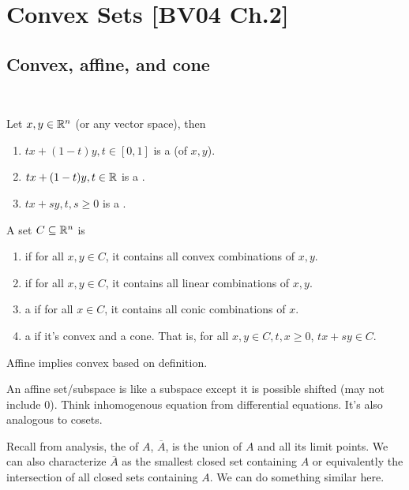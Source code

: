 \documentclass[class=article,crop=false]{standalone}
\begin{document}
\section{Convex Sets [BV04 Ch.2] }
\subsection{Convex, affine, and cone}
~\begin{defn}
	Let $ x,y \in \mathbb{R}^{n}$ (or any vector space), then
	\begin{enumerate}[label=\arabic*)]
		\item $ tx + (1-t)y, t \in [0,1]$ is a  (of $ x,y$).
		\item $ t x+(1-t)y, t \in \mathbb{R}$ is a .
		\item $ t x + sy, t,s \geq 0$ is a  . 
	\end{enumerate}
\end{defn}

\begin{defn}
A set $ C \subseteq \mathbb{R}^{n}$ is
\begin{enumerate}[label=\arabic*)]
	\item {} if for all $ x,y \in C$, it contains all convex combinations of $ x,y$.
	\item  {} if for all $ x,y \in C$, it contains all linear combinations of $ x,y$.
	\item a   if for all $ x \in C$, it contains all conic combinations of $ x$.
	\item a   if it's convex and a cone. That is, for all $ x,y \in C, t,x\geq 0$, $ tx + sy \in C$. 
\end{enumerate}
\end{defn}
\begin{note}
Affine implies convex based on definition.
\end{note}

\begin{remark}
	An affine set/subspace is like a subspace except it is possible shifted (may not include 0). Think inhomogenous equation from differential equations. It's also analogous to cosets.
\end{remark}

Recall from analysis, the  of $ A$, $ \overline{A}$, is the union of $ A$ and all its limit points. We can also characterize $ \overline{A}$ as the smallest closed set containing $ A$ or equivalently the intersection of all closed sets containing $ A$. We can do something similar here.
\end{document}
